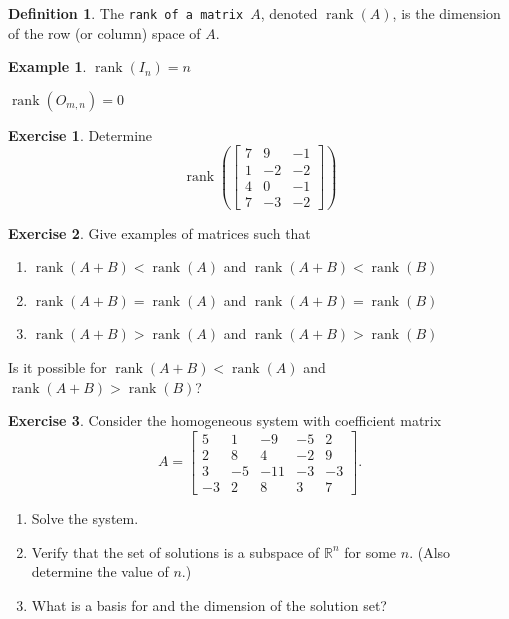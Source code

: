 \documentclass{beamer}
\newcommand{\R}{\mathbb{R}}
\newcommand{\fn}{\insertframenumber}
\newcommand{\rank}{\operatorname{rank}}
\theoremstyle{definition}
\newtheorem{exercise}{Exercise}
\newtheorem*{defn}{Definition}
\newtheorem*{exa}{Example}
\renewcommand{\emph}[1]{{\color{blue}\texttt{#1}}}
\begin{document}
\begin{frame}{\fn}
	\begin{defn}
		The \emph{rank of a matrix $A$}, denoted $\rank(A)$, is the dimension of the row (or column) space of $A$.
	\end{defn}
	\begin{exa}
		$\rank(I_n)=n$
		
		$\rank(O_{m,n})=0$
	\end{exa}
\end{frame}
\begin{frame}{\fn}
	\begin{exercise}
		Determine
		\[\rank\left(\begin{bmatrix}
		7 & 9 & -1 \\
		1 & -2 & -2 \\
		4 & 0 & -1 \\
		7 & -3 & -2
		\end{bmatrix}\right)\]
	\end{exercise}
\end{frame}
\begin{frame}{\fn}
	\begin{exercise}
		Give examples of matrices such that\begin{enumerate}[label=(\alph*)]
			\item $\rank(A+B)<\rank(A)$ and $\rank(A+B)<\rank(B)$
			\item $\rank(A+B)=\rank(A)$ and $\rank(A+B)=\rank(B)$
			\item $\rank(A+B)>\rank(A)$ and $\rank(A+B)>\rank(B)$
		\end{enumerate}
		Is it possible for $\rank(A+B)<\rank(A)$ and $\rank(A+B)>\rank(B)$?
	\end{exercise}
\end{frame}
\begin{frame}{\fn}
	\begin{exercise}
		Consider the homogeneous system with coefficient matrix
		\[A=\begin{bmatrix}
		5 & 1 & -9 & -5 & 2 \\
		2 & 8 & 4 & -2 & 9 \\
		3 & -5 & -11 & -3 & -3 \\
		-3 & 2 & 8 & 3 & 7
		\end{bmatrix}.\]
		\begin{enumerate}[label=(\alph*)]
			\item Solve the system.
		
			\item Verify that the set of solutions is a subspace of $\R^n$ for some $n$.  (Also determine the value of $n$.)
		
			\item What is a basis for and the dimension of the solution set?
		\end{enumerate} 
	\end{exercise}
\end{frame}
\end{document}
